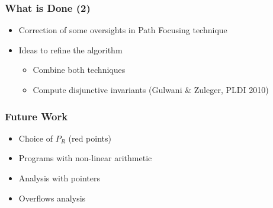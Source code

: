 \documentclass{beamer}
\begin{document}
\begin{frame}
\frametitle{What is Done (2)}

\begin{itemize}
\item Correction of some oversights in Path Focusing technique
\item Ideas to refine the algorithm
\begin{itemize}
\item Combine both techniques
\item Compute disjunctive invariants (Gulwani \& Zuleger, PLDI 2010)
\end{itemize}
\end{itemize}
\end{frame}

\begin{frame}
  \frametitle{Future Work}
\begin{itemize}
\item Choice of $P_R$ (red points)
\item Programs with non-linear arithmetic
\item Analysis with pointers
\item Overflows analysis
\end{itemize}
\end{frame}
\end{document}
